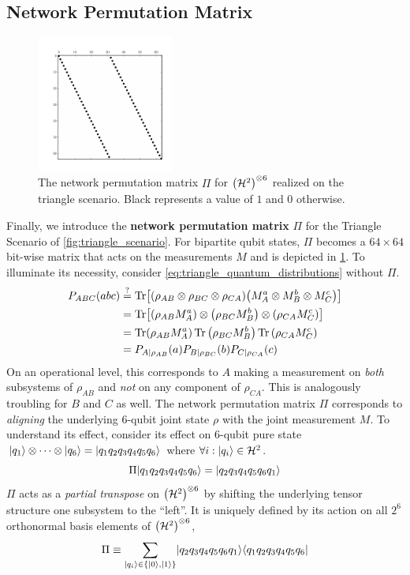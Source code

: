\documentclass[aps, 10pt, english, twoside, pra, nofootinbib, longbibliography]{revtex4-1}
\theoremstyle{plain}
\theoremstyle{definition}
\theoremstyle{remark}
\newcommand{\netperm}{\Pi}
\newcommand{\Hilb}{\mathcal{H}}
\newcommand{\term}[1]{\textcolor{Mahogany}{\textbf{#1}}}
\begin{document}
    \subsection{Network Permutation Matrix}
    \begin{figure}
        \centering
        \includegraphics[trim={1cm 1.2cm 1.0cm 1cm},clip,width=0.4\textwidth]{../figures/perm_mtrx.pdf}
        \caption{The network permutation matrix $\netperm$ for $\br{\Hilb^2}^{\otimes 6}$ realized on the triangle scenario. Black represents a value of $1$ and $0$ otherwise.}
        \label{fig:perm_mtrx}
    \end{figure}
    Finally, we introduce the \term{network permutation matrix} $\netperm$ for the Triangle Scenario of \cref{fig:triangle_scenario}. For bipartite qubit states, $\netperm$ becomes a $64\times64$ bit-wise matrix that acts on the measurements $M$ and is depicted in \cref{fig:perm_mtrx}. To illuminate its necessity, consider \cref{eq:triangle_quantum_distributions} without $\netperm$.
    \begin{align*}
    \prob[ABC]\br{abc} &\stackrel{?}{=} \Tr\bs{\br{\rho_{AB}\otimes\rho_{BC}\otimes\rho_{CA}} \br{M^a_{A}\otimes M^b_{B} \otimes M^c_{C}}}\\
    &= \Tr\bs{\br{\rho_{AB}M^a_{A}}\otimes\br{\rho_{BC}M^b_{B}}\otimes\br{\rho_{CA}M^c_{C}}}\\
    &= \Tr\br{\rho_{AB}M^a_{A}}\Tr{\br{\rho_{BC}M^b_{B}}}\Tr{\br{\rho_{CA}M^c_{C}}}\\
    &= \prob[A\mid \rho_{AB}]\br{a}\prob[B\mid \rho_{BC}]\br{b}\prob[C\mid \rho_{CA}]\br{c}
    \end{align*}
    On an operational level, this corresponds to $A$ making a measurement on \textit{both} subsystems of $\rho_{AB}$ and \textit{not} on any component of $\rho_{CA}$. This is analogously troubling for $B$ and $C$ as well. The network permutation matrix $\netperm$ corresponds to \textit{aligning} the underlying $6$-qubit joint state $\rho$ with the joint measurement $M$. To understand its effect, consider its effect on $6$-qubit pure state $\ket{q_1} \otimes \cdots \otimes \ket{q_6} = \ket{q_1q_2q_3q_4q_5q_6}$ where $\forall i : \ket{q_i} \in \Hilb^2$.
    \[ \netperm\ket{q_1q_2q_3q_4q_5q_6} = \ket{q_2q_3q_4q_5q_6q_1} \]
    $\netperm$ acts as a \textit{partial transpose} on $\br{\Hilb^2}^{\otimes 6}$ by shifting the underlying tensor structure one subsystem to the ``left''. It is uniquely defined by its action on all $2^6$ orthonormal basis elements of $\br{\Hilb^2}^{\otimes 6}$,
    \[ \netperm \defined \sum_{\ket{q_i} \in \bc{\ket{0}, \ket{1}}}\ket{q_2q_3q_4q_5q_6q_1}\bra{q_1q_2q_3q_4q_5q_6} \]
\end{document}
